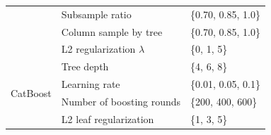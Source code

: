 \documentclass[diagnostics,article,submit,pdftex,moreauthors]{Definitions/mdpi}
\begin{document}
\begin{table}[htbp]
\begin{tabularx}{\linewidth}{llX}
  & Subsample ratio             & \{0.70, 0.85, 1.0\} \\
  & Column sample by tree       & \{0.70, 0.85, 1.0\} \\
  & L2 regularization $\lambda$ & \{0, 1, 5\} \\
\midrule
\multirow{4}{*}{CatBoost}
  & Tree depth                  & \{4, 6, 8\} \\
  & Learning rate               & \{0.01, 0.05, 0.1\} \\
  & Number of boosting rounds   & \{200, 400, 600\} \\
  & L2 leaf regularization      & \{1, 3, 5\} \\
\bottomrule
\end{tabularx}
\end{table}
\end{document}
